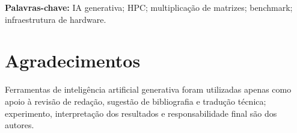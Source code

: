 \documentclass[12pt]{article}
\begin{document}
\noindent\textbf{Palavras-chave:} IA generativa; HPC; multiplicação de matrizes; benchmark; infraestrutura de hardware.









\section*{Agradecimentos}

Ferramentas de inteligência artificial generativa foram utilizadas apenas como apoio à revisão de redação, sugestão de bibliografia e tradução técnica; experimento, interpretação dos resultados e responsabilidade final são dos autores.



\end{document}
